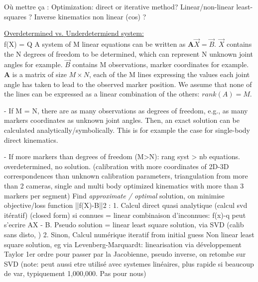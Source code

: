 Où mettre ça :
      Optimization: direct or iterative method?
      Linear/non-linear least-squares ?
      Inverse kinematics non linear (cos) ?
      



\vspace*{0.5cm}

\noindent\underline{Overdetermined vs. Underdetermiend system:}\\




f(X) = Q
A system of M linear equations can be written as $\textbf{A} \overrightarrow{X}=\overrightarrow{B}$. $\overrightarrow{X}$ contains the N degrees of freedom to be determined, which can represent N unknown joint angles for example. $\overrightarrow{B}$ contains M observations, marker coordinates for example. \textbf{A} is a matrix of size $M \times N$, each of the M lines expressing the values each joint angle has taken to lead to the observed marker position. We assume that none of the lines can be expressed as a linear combination of the others: $rank(A)=M$.

- If M = N, there are as many observations as degrees of freedom, e.g., as many markers coordinates as unknown joint angles. Then, an exact solution can be calculated analytically/symbolically. This is for example the case for single-body direct kinematics.

- If more markers than degrees of freedom (M>N): rang syst > nb equations. overdetermined, no solution. (calibration with more coordinates of 2D-3D correspondences than unknown calibration parameters, triangulation from more than 2 cameras, single and multi body optimized kinematics with more than 3 markers per segment)
Find \emph{approximate / optimal} solution, on minimise objective/loss function ||f(X)-B||2 :
1. Calcul direct quasi analytique (calcul svd itératif) (closed form) si connues = linear combinaison d'inconnues: f(x)-q peut s'ecrire AX - B. 
Pseudo solution = linear least square solution, via SVD
(calib sans disto, )
2. Sinon, Calcul numérique iteratif from initial guess
Non linear least square solution, eg via Levenberg-Marquardt: linearisation via développement Taylor 1er ordre pour passer par la Jacobienne, pseudo inverse, on retombe sur SVD
(note: peut aussi etre utilisé avec systemes linéaires, plus rapide si beaucoup de var, typiquement 1,000,000. Pas pour nous)

